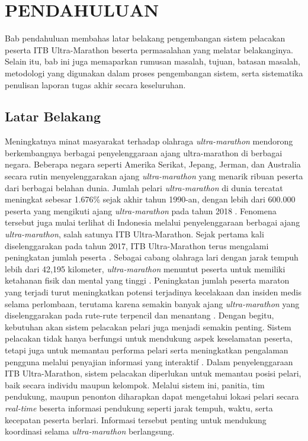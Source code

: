\cleardoublepage %
\chapter{PENDAHULUAN}
\label{chap:pendahuluan}

Bab pendahuluan membahas latar belakang pengembangan sistem pelacakan peserta ITB Ultra-Marathon beserta permasalahan yang melatar belakanginya. Selain itu, bab ini juga memaparkan rumusan masalah, tujuan, batasan masalah, metodologi yang digunakan dalam proses pengembangan sistem, serta sistematika penulisan laporan tugas akhir secara keseluruhan.
\section{Latar Belakang}

Meningkatnya minat masyarakat terhadap olahraga \textit{ultra-marathon} mendorong berkembangnya berbagai penyelenggaraan ajang ultra-marathon di berbagai negara. Beberapa negara seperti Amerika Serikat, Jepang, Jerman, dan Australia secara rutin menyelenggarakan ajang \textit{ultra-marathon} yang menarik ribuan peserta dari berbagai belahan dunia. Jumlah pelari \textit{ultra-marathon} di dunia tercatat meningkat sebesar 1.676\% sejak akhir tahun 1990-an, dengan lebih dari 600.000 peserta yang mengikuti ajang \textit{ultra-marathon} pada tahun 2018 \cite{WMS2024}. Fenomena tersebut juga mulai terlihat di Indonesia melalui penyelenggaraan berbagai ajang \textit{ultra-marathon}, salah satunya ITB Ultra-Marathon. Sejak pertama kali diselenggarakan pada tahun 2017, ITB Ultra-Marathon terus mengalami peningkatan jumlah peserta \cite{Hafizh2025}. Sebagai cabang olahraga lari dengan jarak tempuh lebih dari 42,195 kilometer, \textit{ultra-marathon} menuntut peserta untuk memiliki ketahanan fisik dan mental yang tinggi \cite{Ronto2024}. Peningkatan jumlah peserta maraton yang terjadi turut meningkatkan potensi terjadinya kecelakaan dan insiden medis selama perlombaan, terutama karena semakin banyak ajang \textit{ultra-marathon} yang diselenggarakan pada rute-rute terpencil dan menantang \cite{WMS2024}. Dengan begitu, kebutuhan akan sistem pelacakan pelari juga menjadi semakin penting. Sistem pelacakan tidak hanya berfungsi untuk mendukung aspek keselamatan peserta, tetapi juga untuk memantau performa pelari serta meningkatkan pengalaman pengguna melalui penyajian informasi yang interaktif \cite{Hochreiter2024}. Dalam penyelenggaraan ITB Ultra-Marathon, sistem pelacakan diperlukan untuk memantau posisi pelari, baik secara individu maupun kelompok. Melalui sistem ini, panitia, tim pendukung, maupun penonton diharapkan dapat mengetahui lokasi pelari secara \textit{real-time} beserta informasi pendukung seperti jarak tempuh, waktu, serta kecepatan peserta berlari. Informasi tersebut penting untuk mendukung koordinasi selama \textit{ultra-marathon} berlangsung. 

